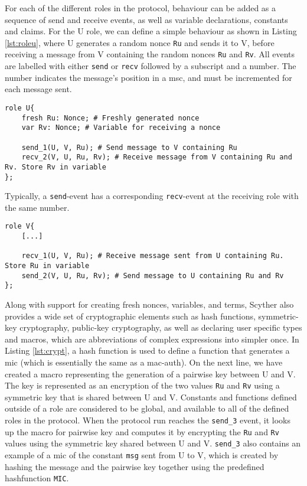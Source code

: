 For each of the different roles in the protocol, behaviour can be added as a sequence of send and receive events, as well as variable declarations, constants and claims. For the U role, we can define a simple behaviour as shown in Listing \ref{lst:roleu}, where U generates a random nonce \texttt{Ru} and sends it to V, before receiving a message from V containing the random nonces \texttt{Ru} and \texttt{Rv}. All events are labelled with either \texttt{send} or \texttt{recv} followed by a subscript and a number. The number indicates the message's position in a \gls{msc}, and must be incremented for each message sent.\newline

\begin{lstlisting}[caption={Terms can be generated, and sent and received when communicating with other agents.}, label={lst:roleu}]
role U{
	fresh Ru: Nonce; # Freshly generated nonce
	var Rv: Nonce; # Variable for receiving a nonce
	
	send_1(U, V, Ru); # Send message to V containing Ru
	recv_2(V, U, Ru, Rv); # Receive message from V containing Ru and Rv. Store Rv in variable
};
\end{lstlisting}



Typically, a \texttt{send}-event has a corresponding \texttt{recv}-event at the receiving role with the same number.\newline


\begin{lstlisting}[caption={Corresponding events in role V to events in role U.}]
role V{
	[...]
	
	recv_1(U, V, Ru); # Receive message sent from U containing Ru. Store Ru in variable
	send_2(V, U, Ru, Rv); # Send message to U containing Ru and Rv
};
\end{lstlisting}


Along with support for creating fresh nonces, variables, and terms, Scyther also provides a wide set of cryptographic elements such as hash functions, symmetric-key cryptography, public-key cryptography, as well as declaring user specific types and macros, which are abbreviations of complex expressions into simpler once. In Listing \ref{lst:crypt}, a hash function is used to define a function that generates a \gls{mic} (which is essentially the same as a \gls{mac-auth}). On the next line, we have created a macro representing the generation of a pairwise key between U and V. The key is represented as an encryption of the two values \texttt{Ru} and \texttt{Rv} using a symmetric key that is shared between U and V. Constants and functions defined outside of a role are considered to be global, and available to all of the defined roles in the protocol. When the protocol run reaches the \texttt{send\_3} event, it looks up the macro for pairwise key and computes it by encrypting the \texttt{Ru} and \texttt{Rv} values using the symmetric key shared between U and V. \texttt{send\_3} also contains an example of a \gls{mic} of the constant \texttt{msg} sent from U to V, which is created by hashing the message and the pairwise key together using the predefined hashfunction \texttt{MIC}.\newline

